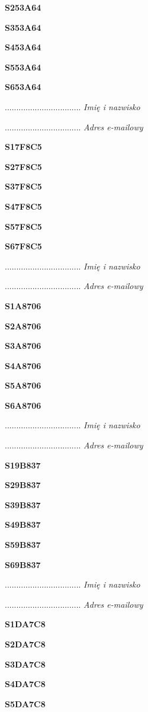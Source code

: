 \Large \textbf{S253A64}

\Large \textbf{S353A64}

\Large \textbf{S453A64}

\Large \textbf{S553A64}

\Large \textbf{S653A64}

.................................
\textit{Imię i nazwisko}

.................................
\textit{Adres e-mailowy}

\Large \textbf{S17F8C5}

\Large \textbf{S27F8C5}

\Large \textbf{S37F8C5}

\Large \textbf{S47F8C5}

\Large \textbf{S57F8C5}

\Large \textbf{S67F8C5}

.................................
\textit{Imię i nazwisko}

.................................
\textit{Adres e-mailowy}

\Large \textbf{S1A8706}

\Large \textbf{S2A8706}

\Large \textbf{S3A8706}

\Large \textbf{S4A8706}

\Large \textbf{S5A8706}

\Large \textbf{S6A8706}

.................................
\textit{Imię i nazwisko}

.................................
\textit{Adres e-mailowy}

\Large \textbf{S19B837}

\Large \textbf{S29B837}

\Large \textbf{S39B837}

\Large \textbf{S49B837}

\Large \textbf{S59B837}

\Large \textbf{S69B837}

.................................
\textit{Imię i nazwisko}

.................................
\textit{Adres e-mailowy}

\Large \textbf{S1DA7C8}

\Large \textbf{S2DA7C8}

\Large \textbf{S3DA7C8}

\Large \textbf{S4DA7C8}

\Large \textbf{S5DA7C8}

